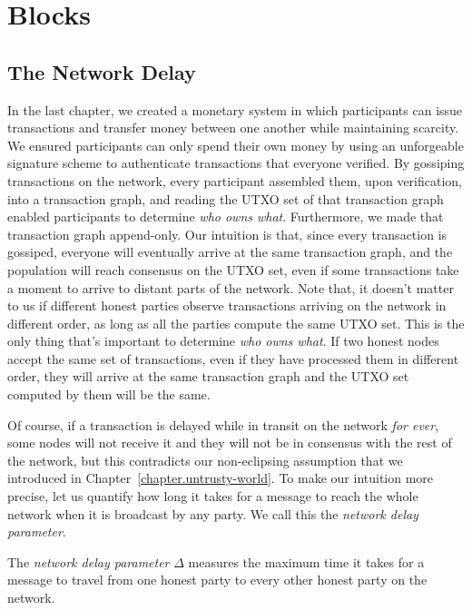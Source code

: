\chapter{Blocks}\label{chapter:blocks}

\section{The Network Delay}

In the last chapter, we created a monetary system in which participants can issue transactions
and transfer money between one another while maintaining scarcity. We ensured participants can
only spend their own money by using an unforgeable signature scheme to authenticate transactions
that everyone verified. By gossiping transactions on the network, every participant assembled
them, upon verification, into a transaction graph, and reading the UTXO set of that transaction
graph enabled participants to determine \emph{who owns what}.
Furthermore, we made that transaction graph append-only. Our intuition is that, since every
transaction is gossiped, everyone will eventually arrive at the same transaction graph,
and the population will reach consensus on the UTXO set, even if some transactions take
a moment to arrive to distant parts of the network. Note that, it doesn't matter to us if
different honest parties observe transactions arriving on the network in different order,
as long as all the parties compute the same UTXO set. This is the only thing that's important
to determine \emph{who owns what}. If two honest nodes accept the same set of transactions,
even if they have processed them in different order, they will arrive at the same transaction
graph and the UTXO set computed by them will be the same.

Of course, if a transaction is delayed while in transit on the network \emph{for ever}, some nodes
will not receive it and they will not be in consensus with the rest of the network, but this
contradicts our non-eclipsing assumption that we introduced in
Chapter~\ref{chapter.untrusty-world}. To make our intuition more precise, let us quantify how
long it takes for a message to reach the whole network when it is broadcast by any party.
We call this the \emph{network delay parameter}.

\begin{definition}
  The \emph{network delay parameter} $\Delta$ measures the maximum time it takes
  for a message to travel from one honest party to every other honest party on the
  network.
\end{definition}

